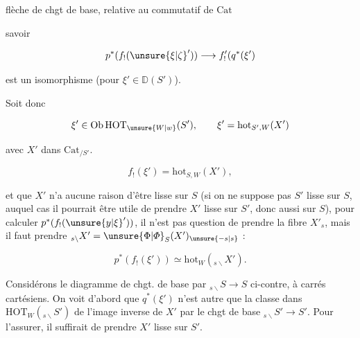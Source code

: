 flèche de chgt de base, relative au  commutatif de $\mathrm{Cat}$


savoir

\[
 p^*(f_!(\unsure{\xi|\zeta}'))\longrightarrow f'_!(q^*(\xi')
\]

est un isomorphisme (pour $\xi'\in\mathbb D(S')$).

Soit donc

\[
 \xi'\in\mathrm{Ob}\,\mathrm{HOT}_{\unsure{W|w}}(S'),\qquad
 \xi'=\mathrm{hot}_{S',W}(X')
\]

avec $X'$ dans $\mathrm{Cat}_{/S'}$.  

\[
 f_!(\xi')=\mathrm{hot}_{S,W}(X'),
\]

et que $X'$ n'a  aucune raison d'être lisse sur $S$ (si on ne suppose pas $S'$  lisse sur $S$, auquel cas il pourrait être utile de  prendre $X'$  lisse sur $S'$, donc aussi sur $S$), pour calculer $p^*(f_!(\unsure{y|\xi}'))$, il n'est pas question de prendre la fibre $X'_s$, mais il faut prendre $ {}_{s\backslash}X'=\unsure{\Phi|\varPhi}_S(X')_{\unsure{-s|s}}$ :

\[
 p^*(f_!(\xi'))\simeq\mathrm{hot}_W({}_{s\backslash}X').
\]


Considérons le diagramme de chgt. de base par $ {}_{s\backslash}S\longrightarrow S$ ci-contre, à carrés cartésiens. On voit d'abord que $q^*(\xi')$ n'est autre que  la classe dans $\mathrm{HOT}_W({}_{s\backslash}S')$ de l'image inverse de $X'$ par le chgt de base $ {}_{s\backslash}S'\longrightarrow S'$. Pour l'assurer, il suffirait de prendre $X'$ lisse sur $S'$. 

